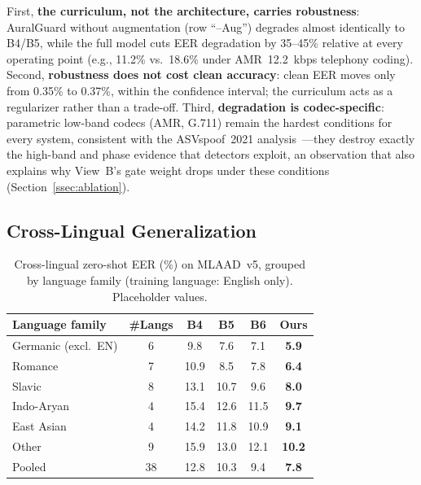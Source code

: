 First, \textbf{the curriculum, not the architecture, carries robustness}: AuralGuard
without augmentation (row ``--Aug'') degrades almost identically to B4/B5, while the
full model cuts EER degradation by 35--45\% relative at every operating point (e.g.,
11.2\% vs.\ 18.6\% under AMR~12.2~kbps telephony coding). Second, \textbf{robustness
does not cost clean accuracy}: clean EER moves only from 0.35\% to 0.37\%, within the
confidence interval; the curriculum acts as a regularizer rather than a trade-off.
Third, \textbf{degradation is codec-specific}: parametric low-band codecs (AMR, G.711)
remain the hardest conditions for every system, consistent with the ASVspoof~2021
analysis~\cite{liu2023asvspoof2021}---they destroy exactly the high-band and phase
evidence that detectors exploit, an observation that also explains why View~B's gate
weight drops under these conditions (Section~\ref{ssec:ablation}).

\subsection{Cross-Lingual Generalization}
\label{ssec:crosslingual}

\begin{table}[t]
\centering
\caption{Cross-lingual zero-shot EER (\%) on MLAAD~v5, grouped by language family
  (training language: English only). Placeholder values.}
\label{tab:crosslingual}
\setlength{\tabcolsep}{4pt}
\footnotesize
\begin{tabular}{lccccc}
\toprule
Language family & \#Langs & B4 & B5 & B6 & Ours \\
\midrule
Germanic (excl.\ EN) & 6 & 9.8 & 7.6 & 7.1 & \textbf{5.9} \\
Romance              & 7 & 10.9 & 8.5 & 7.8 & \textbf{6.4} \\
Slavic               & 8 & 13.1 & 10.7 & 9.6 & \textbf{8.0} \\
Indo-Aryan           & 4 & 15.4 & 12.6 & 11.5 & \textbf{9.7} \\
East Asian           & 4 & 14.2 & 11.8 & 10.9 & \textbf{9.1} \\
Other                & 9 & 15.9 & 13.0 & 12.1 & \textbf{10.2} \\
\midrule
Pooled               & 38 & 12.8 & 10.3 & 9.4 & \textbf{7.8} \\
\bottomrule
\end{tabular}
\end{table}

